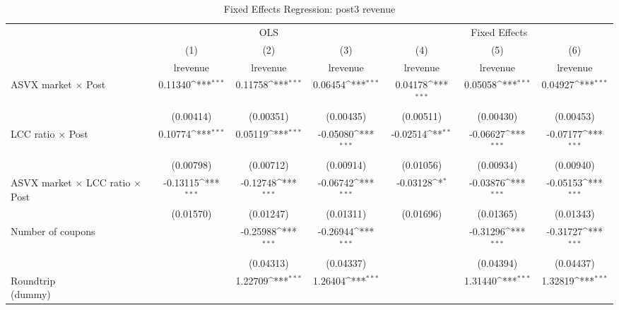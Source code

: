 \begin{table}[htbp]\centering
\def\sym#1{\ifmmode^{#1}\else\(^{#1}\)\fi}
\caption{Fixed Effects Regression: post3 revenue}
\begin{tabular}{l*{6}{c}}
\toprule
                    &\multicolumn{3}{c}{OLS}                                          &\multicolumn{3}{c}{Fixed Effects}                                \\\cmidrule(lr){2-4}\cmidrule(lr){5-7}
                    &\multicolumn{1}{c}{(1)}&\multicolumn{1}{c}{(2)}&\multicolumn{1}{c}{(3)}&\multicolumn{1}{c}{(4)}&\multicolumn{1}{c}{(5)}&\multicolumn{1}{c}{(6)}\\
                    &\multicolumn{1}{c}{lrevenue}&\multicolumn{1}{c}{lrevenue}&\multicolumn{1}{c}{lrevenue}&\multicolumn{1}{c}{lrevenue}&\multicolumn{1}{c}{lrevenue}&\multicolumn{1}{c}{lrevenue}\\
\midrule
ASVX market $\times$ Post&     0.11340\sym{***}&     0.11758\sym{***}&     0.06454\sym{***}&     0.04178\sym{***}&     0.05058\sym{***}&     0.04927\sym{***}\\
                    &   (0.00414)         &   (0.00351)         &   (0.00435)         &   (0.00511)         &   (0.00430)         &   (0.00453)         \\
\addlinespace
LCC ratio $\times$ Post&     0.10774\sym{***}&     0.05119\sym{***}&    -0.05080\sym{***}&    -0.02514\sym{**} &    -0.06627\sym{***}&    -0.07177\sym{***}\\
                    &   (0.00798)         &   (0.00712)         &   (0.00914)         &   (0.01056)         &   (0.00934)         &   (0.00940)         \\
\addlinespace
ASVX market $\times$ LCC ratio $\times$ Post&    -0.13115\sym{***}&    -0.12748\sym{***}&    -0.06742\sym{***}&    -0.03128\sym{*}  &    -0.03876\sym{***}&    -0.05153\sym{***}\\
                    &   (0.01570)         &   (0.01247)         &   (0.01311)         &   (0.01696)         &   (0.01365)         &   (0.01343)         \\
\addlinespace
Number of coupons   &                     &    -0.25988\sym{***}&    -0.26944\sym{***}&                     &    -0.31296\sym{***}&    -0.31727\sym{***}\\
                    &                     &   (0.04313)         &   (0.04337)         &                     &   (0.04394)         &   (0.04437)         \\
\addlinespace
\shortstack{Roundtrip \\ (dummy)}&                     &     1.22709\sym{***}&     1.26404\sym{***}&                     &     1.31440\sym{***}&     1.32819\sym{***}\\

\end{tabular}
\end{table}
